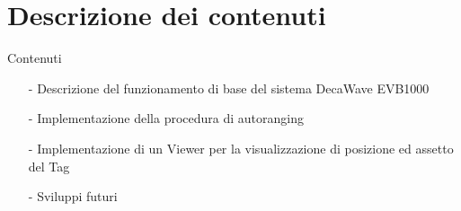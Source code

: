 \section{Descrizione dei contenuti}
\begin{frame}{Contenuti}
  \begin{itemize}
  \item [-] Descrizione del funzionamento di base del sistema DecaWave EVB1000
  \item [-] Implementazione della procedura di autoranging
  \item [-] Implementazione di un Viewer per la visualizzazione di posizione ed assetto del Tag
  \item [-] Sviluppi futuri
  \end{itemize}
\end{frame}
